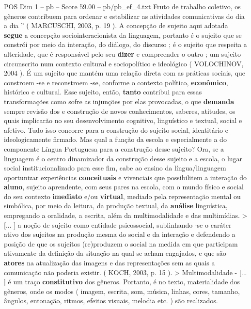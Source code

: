 \begin{textsample}{POS Dim 1 – pb – Score 59.00 – pb/pb\_ef\_4.txt}
Fruto de trabalho coletivo, os gêneros contribuem para ordenar e estabilizar as atividades comunicativas do dia a dia ” ( MARCUSCHI, 2003, p. 19 ).
A concepção de sujeito aqui adotada \textbf{segue} a concepção sociointeracionista da linguagem, portanto é o sujeito que se constrói por meio da interação, do diálogo, do discurso ; é o sujeito que respeita a alteridade, que é responsável pelo seu \textbf{dizer} e compreender o outro ; um sujeito circunscrito num contexto cultural e sociopolítico e ideológico ( VOLOCHINOV, 2004 ).
É um sujeito que mantém uma relação direta com as práticas sociais, que constroem -se e reconstroem -se, conforme o contexto político, \textbf{econômico}, histórico e cultural.
Esse sujeito, então, \textbf{tanto} contribui para essas transformações como sofre as injunções por elas provocadas, o que \textbf{demanda} sempre revisão dos e construção de novos conhecimentos, saberes, atitudes, os quais implicarão no seu desenvolvimento cognitivo, linguístico e textual, social e afetivo.
Tudo isso concorre para a construção do sujeito social, identitário e ideologicamente firmado.
Mas qual a função da escola e especialmente a do componente Língua Portuguesa para a construção desse sujeito?
Ora, se a linguagem é o centro dinamizador da construção desse sujeito e a escola, o lugar social institucionalizado para esse fim, cabe ao ensino da língua/linguagem oportunizar experiências \textbf{conceituais} e vivenciais que possibilitem a interação do \textbf{aluno}, sujeito aprendente, com seus pares na escola, com o mundo físico e social do seu contexto \textbf{imediato} e/ou \textbf{virtual}, mediado pela representação mental ou simbólica, por meio da leitura, da produção textual, da \textbf{análise} linguística, empregando a oralidade, a escrita, além da multimodalidade e das multimídias. > [... ] a noção de sujeito como entidade psicossocial, sublinhando -se o caráter ativo dos sujeitos na produção mesma do social e da interação e defendendo a posição de que os sujeitos (re)produzem o social na medida em que participam ativamente da definição da situação na qual se acham engajados, e que são \textbf{atores} na atualização das imagens e das representações sem as quais a comunicação não poderia existir. ( KOCH, 2003, p. 15 ). > Multimodalidade - [... ] é um traço \textbf{constitutivo} dos gêneros.
Portanto, é no texto, materialidade dos gêneros, onde os modos ( imagem, escrita, som, música, linhas, cores, tamanho, ângulos, entonação, ritmos, efeitos visuais, melodia etc. ) são realizados.

\end{textsample}
